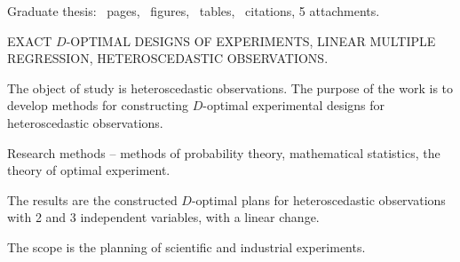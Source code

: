 Graduate thesis: \ pages, \totalfigures{}~figures, \totaltables{}\ tables,
\ citations, 5 attachments.

\vspace{\baselineskip}

EXACT $D$-OPTIMAL DESIGNS OF EXPERIMENTS, LINEAR MULTIPLE REGRESSION, HETEROSCEDASTIC OBSERVATIONS.

\vspace{\baselineskip}

The object of study is heteroscedastic observations. The purpose of the work is to develop methods for constructing $D$-optimal experimental designs for heteroscedastic observations.

Research methods -- methods of probability theory, mathematical
statistics, the theory of optimal experiment.

The results are the constructed $D$-optimal plans for heteroscedastic observations with 2 and 3 independent variables, with a linear change.

The scope is the planning of scientific and industrial experiments.
